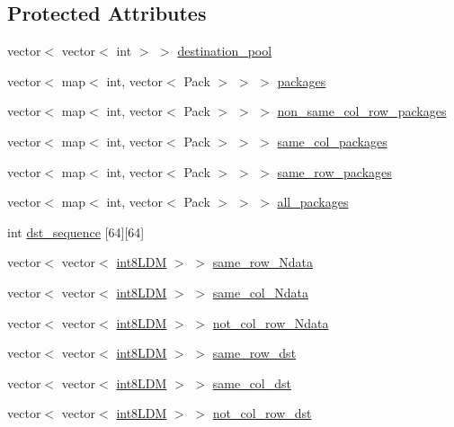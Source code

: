 \subsection*{Protected Attributes}
\begin{DoxyCompactItemize}
\item 
vector$<$ vector$<$ int $>$ $>$ \hyperlink{classRlmpiInitializer_aa08fdf755099726e10c8d148d3c905cc}{destination\_\-pool}
\item 
vector$<$ map$<$ int, vector$<$ Pack $>$ $>$ $>$ \hyperlink{classRlmpiInitializer_aa500439c24ec653ac899a51d41797d85}{packages}
\item 
vector$<$ map$<$ int, vector$<$ Pack $>$ $>$ $>$ \hyperlink{classRlmpiInitializer_a3acae929818bc6552bb88ccad042f0aa}{non\_\-same\_\-col\_\-row\_\-packages}
\item 
vector$<$ map$<$ int, vector$<$ Pack $>$ $>$ $>$ \hyperlink{classRlmpiInitializer_aca6b4f6dcecf079c054faec1d043a884}{same\_\-col\_\-packages}
\item 
vector$<$ map$<$ int, vector$<$ Pack $>$ $>$ $>$ \hyperlink{classRlmpiInitializer_acb7c963b384be703536e9789d5a934da}{same\_\-row\_\-packages}
\item 
vector$<$ map$<$ int, vector$<$ Pack $>$ $>$ $>$ \hyperlink{classRlmpiInitializer_ac16520b366ee157679ca991889a2768b}{all\_\-packages}
\item 
int \hyperlink{classRlmpiInitializer_a14302e2309ab3ce6da75f822d5ead6bc}{dst\_\-sequence} \mbox{[}64\mbox{]}\mbox{[}64\mbox{]}
\item 
vector$<$ vector$<$ \hyperlink{RlmpiSharedType_8h_a69782ffde89d45e86308f10afedf08a6}{int8LDM} $>$ $>$ \hyperlink{classRlmpiInitializer_a5349fc1c4ca51f739fb353ff6f422c4c}{same\_\-row\_\-Ndata}
\item 
vector$<$ vector$<$ \hyperlink{RlmpiSharedType_8h_a69782ffde89d45e86308f10afedf08a6}{int8LDM} $>$ $>$ \hyperlink{classRlmpiInitializer_a1b825243c5e0676e04d16385f22e445e}{same\_\-col\_\-Ndata}
\item 
vector$<$ vector$<$ \hyperlink{RlmpiSharedType_8h_a69782ffde89d45e86308f10afedf08a6}{int8LDM} $>$ $>$ \hyperlink{classRlmpiInitializer_a4e5488f2ff8a56a58dccd083ea13c6c4}{not\_\-col\_\-row\_\-Ndata}
\item 
vector$<$ vector$<$ \hyperlink{RlmpiSharedType_8h_a69782ffde89d45e86308f10afedf08a6}{int8LDM} $>$ $>$ \hyperlink{classRlmpiInitializer_abe5095bd90a7f74d1bb8284098966fc9}{same\_\-row\_\-dst}
\item 
vector$<$ vector$<$ \hyperlink{RlmpiSharedType_8h_a69782ffde89d45e86308f10afedf08a6}{int8LDM} $>$ $>$ \hyperlink{classRlmpiInitializer_a1bde89fc33eccd4ca66492cfb4d35934}{same\_\-col\_\-dst}
\item 
vector$<$ vector$<$ \hyperlink{RlmpiSharedType_8h_a69782ffde89d45e86308f10afedf08a6}{int8LDM} $>$ $>$ \hyperlink{classRlmpiInitializer_a77a01156d9dc0028c4044c23bd28d41c}{not\_\-col\_\-row\_\-dst}
\end{DoxyCompactItemize}

